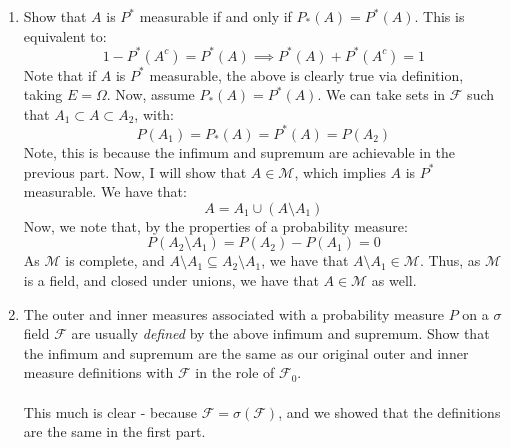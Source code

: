 \documentclass[12pt,a4paper]{article}
\newcommand{\1}[1]{\mathbbm{1}\left\{ #1 \right\}}
\newcommand{\fcal}{\mathcal{F}}
\newcommand{\mcal}{\mathcal{M}}
\begin{document}
\begin{enumerate}
	\item Show that $A$ is $P^*$ measurable if and only if $P_*(A) = P^*(A)$. This is equivalent to:
	$$
		1 - P^*(A^c) = P^*(A) \implies
		P^*(A) + P^*(A^c) = 1
	$$
	Note that if $A$ is $P^*$ measurable, the above is clearly true via definition, taking $E = \Omega$. Now, assume $P_*(A) = P^*(A)$. We can take sets in $\fcal$ such that $A_1 \subset A \subset A_2$, with:
	$$
		P(A_1) = P_*(A) = P^*(A) = P(A_2)
	$$
	Note, this is because the infimum and supremum are achievable in the previous part. Now, I will show that $A \in \mcal$, which implies $A$ is $P^*$ measurable. We have that:
	$$
		A = A_1 \cup (A \setminus A_1)
	$$
	Now, we note that, by the properties of a probability measure:
	$$
		P(A_2 \setminus A_1) = P(A_2) - P(A_1) = 0
	$$
	As $\mcal$ is complete, and $A \setminus A_1 \subseteq A_2 \setminus A_1$, we have that $A \setminus A_1 \in \mcal$. Thus, as $\mcal$ is a field, and closed under unions, we have that $A \in \mcal$ as well. 
	
	\item The outer and inner measures associated with a probability measure $P$ on a $\sigma$ field $\fcal$ are usually \textit{defined} by the above infimum and supremum. Show that the infimum and supremum are the same as our original outer and inner measure definitions with $\fcal$ in the role of $\fcal_0$.
	\\\\
	This much is clear - because $\fcal = \sigma(\fcal)$, and we showed that the definitions are the same in the first part.
\end{enumerate}
\end{document}
